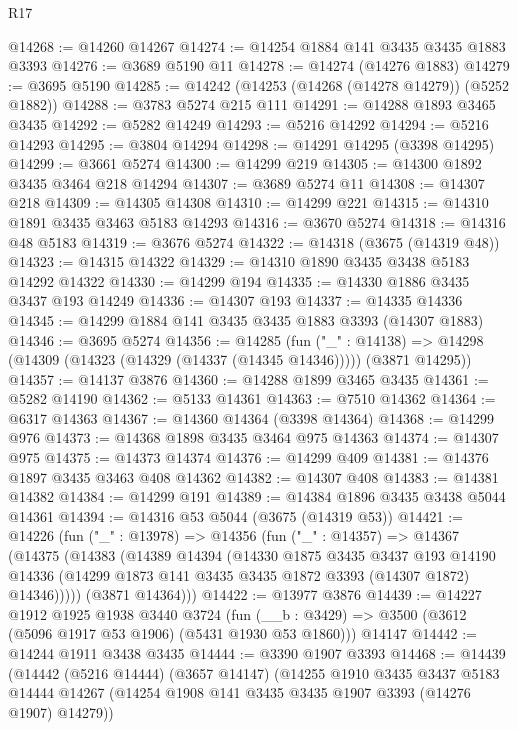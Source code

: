 \begin{lexlean}{R17}
\begin{coremodule}
@14268 := @14260 @14267
@14274 := @14254 @1884 @141 @3435 @3435 @1883 @3393
@14276 := @3689 @5190 @11
@14278 := @14274 (@14276 @1883)
@14279 := @3695 @5190
@14285 := @14242 (@14253 (@14268 (@14278 @14279)) (@5252 @1882))
@14288 := @3783 @5274 @215 @111
@14291 := @14288 @1893 @3465 @3435
@14292 := @5282 @14249
@14293 := @5216 @14292
@14294 := @5216 @14293
@14295 := @3804 @14294
@14298 := @14291 @14295 (@3398 @14295)
@14299 := @3661 @5274
@14300 := @14299 @219
@14305 := @14300 @1892 @3435 @3464 @218 @14294
@14307 := @3689 @5274 @11
@14308 := @14307 @218
@14309 := @14305 @14308
@14310 := @14299 @221
@14315 := @14310 @1891 @3435 @3463 @5183 @14293
@14316 := @3670 @5274
@14318 := @14316 @48 @5183
@14319 := @3676 @5274
@14322 := @14318 (@3675 (@14319 @48))
@14323 := @14315 @14322
@14329 := @14310 @1890 @3435 @3438 @5183 @14292 @14322
@14330 := @14299 @194
@14335 := @14330 @1886 @3435 @3437 @193 @14249
@14336 := @14307 @193
@14337 := @14335 @14336
@14345 := @14299 @1884 @141 @3435 @3435 @1883 @3393 (@14307 @1883)
@14346 := @3695 @5274
@14356 := @14285
    (fun ("_" : @14138) =>
    @14298 (@14309 (@14323 (@14329 (@14337 (@14345 @14346))))) (@3871 @14295))
@14357 := @14137 @3876
@14360 := @14288 @1899 @3465 @3435
@14361 := @5282 @14190
@14362 := @5133 @14361
@14363 := @7510 @14362
@14364 := @6317 @14363
@14367 := @14360 @14364 (@3398 @14364)
@14368 := @14299 @976
@14373 := @14368 @1898 @3435 @3464 @975 @14363
@14374 := @14307 @975
@14375 := @14373 @14374
@14376 := @14299 @409
@14381 := @14376 @1897 @3435 @3463 @408 @14362
@14382 := @14307 @408
@14383 := @14381 @14382
@14384 := @14299 @191
@14389 := @14384 @1896 @3435 @3438 @5044 @14361
@14394 := @14316 @53 @5044 (@3675 (@14319 @53))
@14421 := @14226
    (fun ("_" : @13978) =>
    @14356
      (fun ("_" : @14357) =>
      @14367
        (@14375
          (@14383
            (@14389
              @14394
              (@14330
                @1875
                @3435
                @3437
                @193
                @14190
                @14336
                (@14299 @1873 @141 @3435 @3435 @1872 @3393 (@14307 @1872) @14346)))))
        (@3871 @14364)))
@14422 := @13977 @3876
@14439 := @14227
    @1912
    @1925
    @1938
    @3440
    @3724
    (fun (__b : @3429) => @3500 (@3612 (@5096 @1917 @53 @1906) (@5431 @1930 @53 @1860)))
    @14147
@14442 := @14244 @1911 @3438 @3435
@14444 := @3390 @1907 @3393
@14468 := @14439
    (@14442
      (@5216 @14444)
      (@3657 @14147)
      (@14255
        @1910
        @3435
        @3437
        @5183
        @14444
        @14267
        (@14254 @1908 @141 @3435 @3435 @1907 @3393 (@14276 @1907) @14279))

\end{coremodule}
\end{lexlean}
